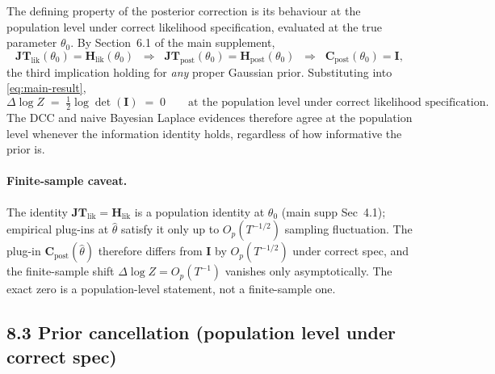 \documentclass[11pt]{article}
\begin{document}
The defining property of the posterior correction is its behaviour at the population
level under correct likelihood specification, evaluated at the true parameter $\theta_0$.
By Section~6.1 of the main supplement,
\begin{equation}
\mathbf{JT}_{\mathrm{lik}}(\theta_0) = \mathbf H_{\mathrm{lik}}(\theta_0)
\;\;\Longrightarrow\;\;
\mathbf{JT}_{\mathrm{post}}(\theta_0) = \mathbf H_{\mathrm{post}}(\theta_0)
\;\;\Longrightarrow\;\;
\mathbf C_{\mathrm{post}}(\theta_0) = \mathbf I,
\label{eq:calibration-chain}
\end{equation}
the third implication holding for \emph{any} proper Gaussian prior. Substituting into
\eqref{eq:main-result},
\begin{equation}
\Delta\log Z
\;=\;
\tfrac{1}{2}\log\det(\mathbf I)
\;=\;
0
\qquad\text{at the population level under correct likelihood specification.}
\label{eq:DeltaZ-correct}
\end{equation}
The DCC and naive Bayesian Laplace evidences therefore agree at the population
level whenever the information identity holds, regardless of how informative the prior is.

\paragraph{Finite-sample caveat.}
The identity $\mathbf{JT}_{\mathrm{lik}} = \mathbf H_{\mathrm{lik}}$ is a population
identity at $\theta_0$ (main supp Sec~4.1); empirical plug-ins at $\hat\theta$ satisfy
it only up to $O_p(T^{-1/2})$ sampling fluctuation. The plug-in
$\mathbf C_{\mathrm{post}}(\hat\theta)$ therefore differs from $\mathbf I$ by $O_p(T^{-1/2})$
under correct spec, and the finite-sample shift
$\Delta\log Z = O_p(T^{-1})$ vanishes only asymptotically. The exact zero is a
population-level statement, not a finite-sample one.

\subsection*{8.3 Prior cancellation (population level under correct spec)}
\end{document}
